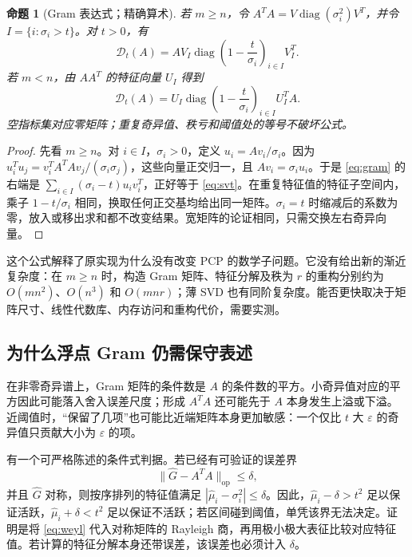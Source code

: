 \documentclass[UTF8,fontset=none,zihao=-4,a4paper]{ctexart}
\theoremstyle{plainzh}
\newtheorem{proposition}{命题}[section]
\newcommand{\op}[1]{\lVert #1\rVert_{\mathrm{op}}}
\newcommand{\SVT}{\mathcal D}
\newcommand{\diag}{\operatorname{diag}}
\numberwithin{equation}{section}
\begin{document}
\begin{proposition}[Gram 表达式；精确算术]\label{prop:gram}
若 $m\geq n$，令 $A^TA=V\diag(\sigma_i^2)V^T$，并令 $I=\{i:\sigma_i>t\}$。对 $t>0$，有
\begin{equation}\label{eq:gram}
 \SVT_t(A)=A V_I\diag\left(1-\frac{t}{\sigma_i}\right)_{i\in I}V_I^T.
\end{equation}
若 $m<n$，由 $AA^T$ 的特征向量 $U_I$ 得到
\begin{equation}
 \SVT_t(A)=U_I\diag\left(1-\frac{t}{\sigma_i}\right)_{i\in I}U_I^TA.
\end{equation}
空指标集对应零矩阵；重复奇异值、秩亏和阈值处的等号不破坏公式。
\end{proposition}
\begin{proof}
先看 $m\geq n$。对 $i\in I$，$\sigma_i>0$，定义 $u_i=Av_i/\sigma_i$。因为
$u_i^Tu_j=v_i^TA^TAv_j/(\sigma_i\sigma_j)$，这些向量正交归一，且 $Av_i=\sigma_i u_i$。于是 \eqref{eq:gram} 的右端是
$\sum_{i\in I}(\sigma_i-t)u_iv_i^T$，正好等于 \eqref{eq:svt}。在重复特征值的特征子空间内，乘子 $1-t/\sigma_i$ 相同，换取任何正交基均给出同一矩阵。$\sigma_i=t$ 时缩减后的系数为零，放入或移出求和都不改变结果。宽矩阵的论证相同，只需交换左右奇异向量。
\end{proof}

这个公式解释了原实现为什么没有改变 PCP 的数学子问题。它没有给出新的渐近复杂度：在 $m\geq n$ 时，构造 Gram 矩阵、特征分解及秩为 $r$ 的重构分别约为 $O(mn^2)$、$O(n^3)$ 和 $O(mnr)$；薄 SVD 也有同阶复杂度。能否更快取决于矩阵尺寸、线性代数库、内存访问和重构代价，需要实测。

\subsection{为什么浮点 Gram 仍需保守表述}
在非零奇异谱上，Gram 矩阵的条件数是 $A$ 的条件数的平方。小奇异值对应的平方因此可能落入舍入误差尺度；形成 $A^TA$ 还可能先于 $A$ 本身发生上溢或下溢。近阈值时，“保留了几项”也可能比近端矩阵本身更加敏感：一个仅比 $t$ 大 $\varepsilon$ 的奇异值只贡献大小为 $\varepsilon$ 的项。

有一个可严格陈述的条件式判据。若已经有可验证的误差界
\begin{equation}\label{eq:weyl}
 \op{\widehat G-A^TA}\leq\delta,
\end{equation}
并且 $\widehat G$ 对称，则按序排列的特征值满足
$|\widehat\mu_i-\sigma_i^2|\leq\delta$。因此，$\widehat\mu_i-\delta>t^2$ 足以保证活跃，$\widehat\mu_i+\delta<t^2$ 足以保证不活跃；若区间碰到阈值，单凭该界无法决定。证明是将 \eqref{eq:weyl} 代入对称矩阵的 Rayleigh 商，再用极小极大表征比较对应特征值。若计算的特征分解本身还带误差，该误差也必须计入 $\delta$。
\end{document}
